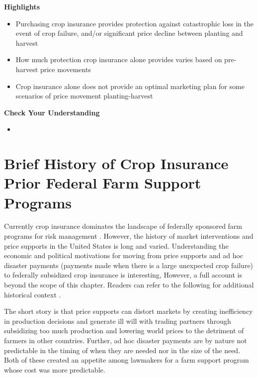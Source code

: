 \documentclass[
]{book}
\providecommand{\tightlist}{%
  \setlength{\itemsep}{0pt}\setlength{\parskip}{0pt}}
\begin{document}
\textbf{Highlights}

\begin{itemize}
\tightlist
\item
  Purchasing crop insurance provides protection against catastrophic loss in the event of crop failure, and/or significant price decline between planting and harvest
\item
  How much protection crop insurance alone provides varies based on pre-harvest price movements
\item
  Crop insurance alone does not provide an optimal marketing plan for some scenarios of price movement planting-harvest
\end{itemize}

\textbf{Check Your Understanding}

\begin{itemize}
\tightlist
\item
\end{itemize}

\hypertarget{brief-history-of-crop-insurance-prior-federal-farm-support-programs}{%
\section{Brief History of Crop Insurance Prior Federal Farm Support Programs}\label{brief-history-of-crop-insurance-prior-federal-farm-support-programs}}

Currently crop insurance dominates the landscape of federally sponsored farm programs for risk management \citep{walters_net_2017}. However, the history of market interventions and price supports in the United States is long and varied. Understanding the economic and political motivations for moving from price supports and ad hoc disaster payments (payments made when there is a large unexpected crop failure) to federally subsidized crop insurance is interesting, However, a full account is beyond the scope of this chapter. Readers can refer to the following for additional historical context \citep{babcock_crop_2006, glauber_united_2016, cochran_price_1951, marcus_valuation_1986, lichtenberg_welfare_1986, noauthor_history_1984}.

The short story is that price supports can distort markets by creating inefficiency in production decisions and generate ill will with trading partners through subsidizing too much production and lowering world prices to the detriment of farmers in other countries. Further, ad hoc disaster payments are by nature not predictable in the timing of when they are needed nor in the size of the need. Both of these created an appetite among lawmakers for a farm support program whose cost was more predictable.
\end{document}
